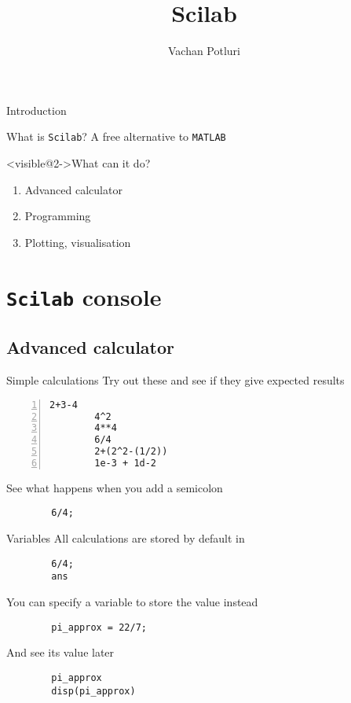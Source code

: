 \documentclass[%
    10pt,
    xcolor={dvipsnames},
    handout,
]{beamer}
\title{Scilab}
\author[Vachan Potluri]{%
    Vachan Potluri\\
    \email{vachanpotluri@iitb.ac.in}
}
\newcommand{\inlinecode}[1]{\inlinecodebox{#1}} %
\newcommand{\matlab}{\texttt{MATLAB}}
\newcommand{\scilab}{\texttt{Scilab}}
\begin{document}
\setlength\leftmargini{1em} %
\setlength\leftmarginii{\leftmargini} %
\setlength\leftmarginiii{\leftmarginii} %

{
    \begin{frame}
        \titlepage
    \end{frame}
}

\begin{frame}{Introduction}
    \begin{block}{What is \scilab?}
        A free alternative to \matlab
    \end{block}
    \begin{block}<visible@2->{What can it do?}
        \begin{enumerate}
            \item Advanced calculator
            \item Programming
            \item Plotting, visualisation
        \end{enumerate}
    \end{block}
\end{frame}

\section{\scilab{} console}
\subsection{Advanced calculator}
\begin{frame}[fragile]{Simple calculations}
    Try out these and see if they give expected results
    \begin{lstlisting}[numbers=left]
        2+3-4
        4^2
        4**4
        6/4
        2+(2^2-(1/2))
        1e-3 + 1d-2
    \end{lstlisting}
    See what happens when you add a semicolon
    \begin{lstlisting}
        6/4;
    \end{lstlisting}
\end{frame}

\begin{frame}[fragile]{Variables}
    All calculations are stored by default in \inlinecode{ans}
    \begin{lstlisting}
        6/4;
        ans
    \end{lstlisting}
    You can specify a variable to store the value instead
    \begin{lstlisting}
        pi_approx = 22/7;
    \end{lstlisting}
    And see its value later
    \begin{lstlisting}
        pi_approx
        disp(pi_approx)
    \end{lstlisting}
\end{frame}
\end{document}
